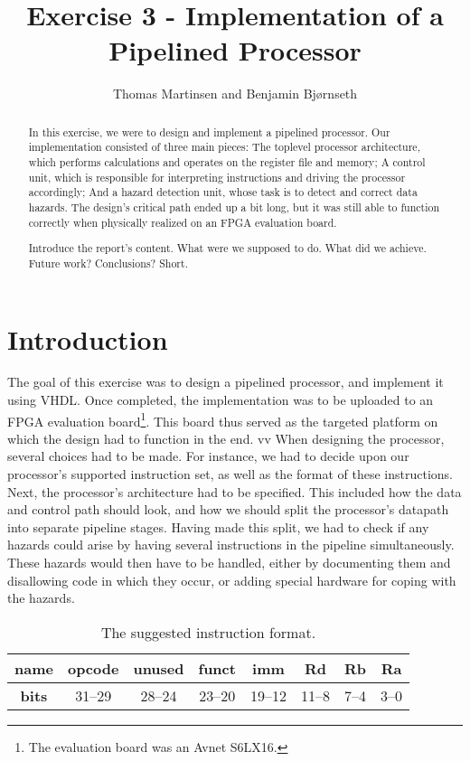 \documentclass[11pt]{article}
\title{Exercise 3 - Implementation of a Pipelined Processor}
\author{Thomas Martinsen and Benjamin Bj\o rnseth}
\begin{document}
\maketitle

\begin{abstract}
  In this exercise, we were to design and implement a pipelined
  processor. Our implementation consisted of three main pieces: The
  toplevel processor architecture, which performs calculations and
  operates on the register file and memory; A control unit, which is
  responsible for interpreting instructions and driving the processor
  accordingly; And a hazard detection unit, whose task is to detect
  and correct data hazards. The design's critical path ended up a bit
  long, but it was still able to function correctly when physically
  realized on an FPGA evaluation board.

  Introduce the report's content. What were we supposed to do. What
  did we achieve. Future work? Conclusions? Short.
\end{abstract}

\section{Introduction}
\label{sec:introduction}
The goal of this exercise was to design a pipelined processor, and
implement it using VHDL. Once completed, the implementation was to be
uploaded to an FPGA evaluation board\footnote{The evaluation board was
  an Avnet S6LX16.}. This board thus served as the targeted platform
on which the design had to function in the end. 
vv
When designing the processor, several choices had to be made. For
instance, we had to decide upon our processor's supported instruction
set, as well as the format of these instructions. Next, the
processor's architecture had to be specified. This included how the
data and control path should look, and how we should split the
processor's datapath into separate pipeline stages. Having made this
split, we had to check if any hazards could arise by having several
instructions in the pipeline simultaneously. These hazards would then
have to be handled, either by documenting them and disallowing code in
which they occur, or adding special hardware for coping with the
hazards.

\begin{table}[htbp]
  \centering
  \begin{tabular}{|c|c|c|c|c|c|c|c|}
    \hline
    {\bf name} & opcode & unused & funct & imm & Rd & Rb & Ra \\ \hline
    {\bf bits} & 31--29 & 28--24 & 23--20 & 19--12 & 11--8 & 7--4 & 3--0 \\ \hline
  \end{tabular}
  \caption{The suggested instruction format.}
  \label{tab:suggestedFormat}
\end{table}
\end{document}
